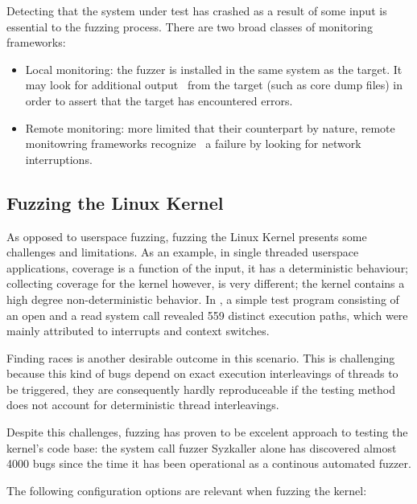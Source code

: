 Detecting that the system under test has crashed as a result of some input is essential to the fuzzing process.
There are two broad classes of monitoring frameworks\cite{mcnallyFuzzingStateArt2012}:

\begin{itemize}
    \item Local monitoring: the fuzzer is installed in the same system as the target. It may look for additional output \
    from the target (such as core dump files) in order to assert that the target has encountered errors.
    \item Remote monitoring: more limited that their counterpart by nature, remote monitowring frameworks recognize \
    a failure by looking for network interruptions.
\end{itemize}

\subsection{Fuzzing the Linux Kernel}

As opposed to userspace fuzzing, fuzzing the Linux Kernel
presents some challenges and limitations. As an example, in single threaded
userspace applications, coverage is a function of the input, it has a
deterministic behaviour; collecting coverage for the kernel however, is
very different;  the kernel contains a high degree
non-deterministic behavior. In \cite{okechInvestigatingExecutionPath2013}, a
simple test program consisting of an open and a read system call revealed
559 distinct execution paths, which were mainly attributed to interrupts and context switches.

Finding races is another desirable outcome in this scenario. This is
challenging because this kind of bugs depend on exact
execution interleavings of threads to be triggered, they are consequently hardly reproduceable if the testing method does not account for deterministic
thread interleavings.

Despite this challenges, fuzzing has proven to be excelent approach to testing the
kernel's code base: the system call fuzzer Syzkaller alone has discovered
almost  4000 bugs since the time it has been operational as a continous
automated fuzzer\cite{Syzbot}.

The following configuration options are relevant when fuzzing the kernel:

